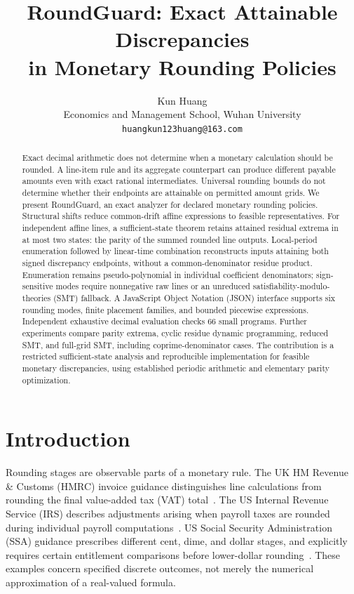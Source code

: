 \documentclass[11pt]{article}
\title{RoundGuard: Exact Attainable Discrepancies\\in Monetary Rounding Policies}
\author{Kun Huang\\\small Economics and Management School, Wuhan University\\\small \texttt{huangkun123huang@163.com}}
\date{}
\begin{document}
\maketitle
\begin{abstract}
Exact decimal arithmetic does not determine when a monetary calculation should be rounded. A line-item rule and its aggregate counterpart can produce different payable amounts even with exact rational intermediates. Universal rounding bounds do not determine whether their endpoints are attainable on permitted amount grids. We present RoundGuard, an exact analyzer for declared monetary rounding policies. Structural shifts reduce common-drift affine expressions to feasible representatives. For independent affine lines, a sufficient-state theorem retains attained residual extrema in at most two states: the parity of the summed rounded line outputs. Local-period enumeration followed by linear-time combination reconstructs inputs attaining both signed discrepancy endpoints, without a common-denominator residue product. Enumeration remains pseudo-polynomial in individual coefficient denominators; sign-sensitive modes require nonnegative raw lines or an unreduced satisfiability-modulo-theories (SMT) fallback. A JavaScript Object Notation (JSON) interface supports six rounding modes, finite placement families, and bounded piecewise expressions. Independent exhaustive decimal evaluation checks 66 small programs. Further experiments compare parity extrema, cyclic residue dynamic programming, reduced SMT, and full-grid SMT, including coprime-denominator cases. The contribution is a restricted sufficient-state analysis and reproducible implementation for feasible monetary discrepancies, using established periodic arithmetic and elementary parity optimization.
\end{abstract}

\section{Introduction}
Rounding stages are observable parts of a monetary rule. The UK HM Revenue \& Customs (HMRC) invoice guidance distinguishes line calculations from rounding the final value-added tax (VAT) total~\citep{hmrc_vat}. The US Internal Revenue Service (IRS) describes adjustments arising when payroll taxes are rounded during individual payroll computations~\citep{irs_p15}. US Social Security Administration (SSA) guidance prescribes different cent, dime, and dollar stages, and explicitly requires certain entitlement comparisons before lower-dollar rounding~\citep{ssa_rounding}. These examples concern specified discrete outcomes, not merely the numerical approximation of a real-valued formula.
\end{document}
